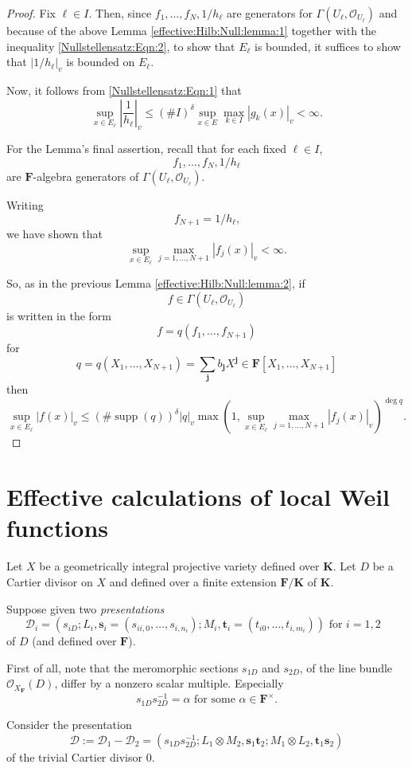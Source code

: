 \documentclass[10pt]{amsart}
\renewcommand{\leq}{\leqslant}
\newcommand{\Osh}{{\mathcal O}}                        %
\newcommand{\KK}{\mathbf{K}}
\newcommand{\FF}{\mathbf{F}}
\theoremstyle{definition}
\numberwithin{equation}{section}
\begin{document}
\begin{proof}
Fix $\ell \in I$.  Then, since $f_1,\dots,f_N,1/h_\ell$ are generators for $\Gamma(U_\ell,\Osh_{U_{\ell}})$ and because of the above Lemma \ref{effective:Hilb:Null:lemma:1} together with the inequality \eqref{Nullstellensatz:Eqn:2}, to show that $E_\ell$ is bounded, 
it suffices to show that $|1/h_\ell|_v$ is bounded on $E_\ell$.  

Now, it follows from \eqref{Nullstellensatz:Eqn:1} that
$$
\sup_{x \in E_{\ell}} \left| \frac{1}{h_\ell} \right|_v \leq (\# I)^\delta \sup_{x \in E} \max_{k \in I} |g_k(x)|_v < \infty \text{.}
$$

For the Lemma's final assertion, recall that for each fixed $\ell \in I$, 
$$
f_1,\dots,f_N,1/h_\ell
$$
are $\FF$-algebra generators of $\Gamma(U_{\ell},\Osh_{U_{\ell}})$.

Writing 
$$f_{N+1} = 1 / h_\ell\text{,}$$ 
we have shown that 
$$
\sup_{x \in E_{\ell}} \max_{j=1,\dots,N+1} |f_j(x)|_v < \infty \text{.}
$$

So, as in the previous Lemma \ref{effective:Hilb:Null:lemma:2}, if 
$$
f \in \Gamma(U_{\ell},\Osh_{U_{\ell}})
$$
is written in the form
$$
f = q(f_1,\dots,f_{N+1}) 
$$
for 
$$
q = q(X_1,\dots,X_{N+1}) = \sum_{\mathbf{j}} b_{\mathbf{j}} X^{\mathbf{j}} \in \FF[X_1,\dots,X_{N+1}] 
$$
then
$$
\sup_{x \in E_{\ell}} | f(x)|_v \leq (\# \operatorname{supp}(q))^{\delta} |q|_v \max\left(1,\sup_{x \in E_{\ell}} \max_{j=1,\dots,N+1} |f_j(x)|_v\right)^{\deg q} \text{.}
$$
\end{proof}

\section{Effective calculations of local Weil functions}\label{main:thm:section}

Let $X$ be a geometrically integral projective variety defined over $\KK$.  Let $D$ be a Cartier divisor on $X$ and defined over a finite extension $\FF / \KK$ of $\KK$.

Suppose given two \emph{presentations}
$$
\mathcal{D}_i = (s_{iD}; L_i,\mathbf{s}_i = (s_{ii,0},\dots,s_{i,n_i}); M_i, \mathbf{t}_i = (t_{i0},\dots,t_{i,m_i})) \text{ for $i = 1,2$ }
$$
of $D$ (and defined over $\FF$).  

First of all, note that the meromorphic sections $s_{1D}$ and $s_{2D}$, of the line bundle $\Osh_{X_{\FF}}(D)$, differ by a nonzero scalar multiple.  Especially
$$
s_{1D} s_{2D}^{-1} = \alpha \text{ 
for some $\alpha \in \FF^\times$.
}
$$

Consider the presentation
$$
\mathcal{D} := \mathcal{D}_1 - \mathcal{D}_2 = (s_{1D}s_{2D}^{-1}; L_1 \otimes M_2, \mathbf{s}_1 \mathbf{t}_2; M_1 \otimes L_2, \mathbf{t}_1 \mathbf{s}_2)
$$
of the trivial Cartier divisor $0$.  
\end{document}

